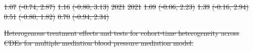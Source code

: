 \documentclass[
  letterpaper,
  DIV=11,
  numbers=noendperiod]{scrartcl}
\makeatletter
\renewenvironment{table}%
   {\renewcommand\familydefault\sfdefault
    \@float{table}}
   {\end@float}
\providecommand{\DIFdeltex}[1]{{\protect\color{red}\sout{#1}}}                      %
\providecommand{\DIFdelFL}[1]{\DIFdel{#1}} %
\providecommand{\DIFdel}[1]{\texorpdfstring{\DIFdeltex{#1}}{}} %
\makeatother
\begin{document}
\DIFdelFL{1.07 }%
\DIFdelFL{(-0.74, 2.87) }%
\DIFdelFL{1.16 }%
\DIFdelFL{(-0.80, 3.13)}%
\DIFdelFL{\hspace{1em}2021 }%
\DIFdelFL{2021 }%
\DIFdelFL{1.09 }%
\DIFdelFL{(-0.06, 2.23) }%
\DIFdelFL{1.39 }%
\DIFdelFL{(-0.16, 2.94) }%
\DIFdelFL{0.51 }%
\DIFdelFL{(-0.80, 1.82) }%
\DIFdelFL{0.70 }%
\DIFdelFL{(-0.94, 2.34)}%

{%
\DIFdelFL{Heterogenous treatment effects and tests for cohort-time heterogeneity
across CDEs for multiple mediation blood pressure mediation model. }}%
\end{document}
